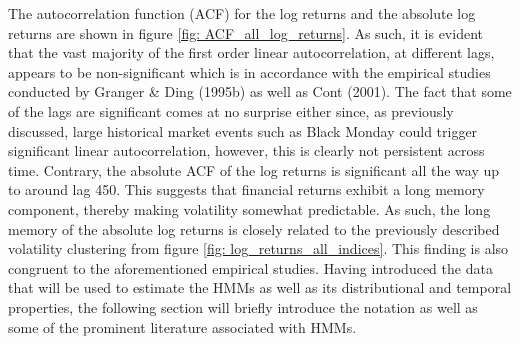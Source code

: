 The autocorrelation function (ACF) for the log returns and the absolute log returns are shown in figure \ref{fig: ACF_all_log_returns}. As such, it is evident that the vast majority of the first order linear autocorrelation, at different lags, appears to be non-significant which is in accordance with the empirical studies conducted by Granger \& Ding (1995b) as well as Cont (2001). The fact that some of the lags are significant comes at no surprise either since, as previously discussed, large historical market events such as Black Monday could trigger significant linear autocorrelation, however, this is clearly not persistent across time. Contrary, the absolute ACF of the log returns is significant all the way up to around lag 450. This suggests that financial returns exhibit a long memory component, thereby making volatility somewhat predictable. As such, the long memory of the absolute log returns is closely related to the previously described volatility clustering from figure \ref{fig: log_returns_all_indices}. This finding is also congruent to the aforementioned empirical studies. Having introduced the data that will be used to estimate the HMMs as well as its distributional and temporal properties, the following section will briefly introduce the notation as well as some of the prominent literature associated with HMMs.
